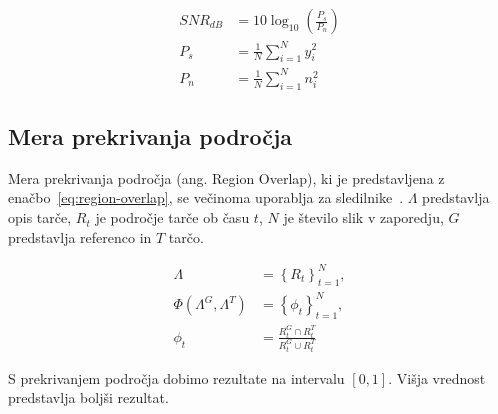 \begin{subequations}
\begin{align}
SNR_{dB} &= 10 \log_{10}\left(\frac{P_s}{P_n}\right) \\
P_s &= \frac{1}{N} \sum_{i=1}^{N} y_i^2 \\
P_n &= \frac{1}{N} \sum_{i=1}^{N} n_i^2
\end{align}
\label{eq:snr}
\end{subequations}



\subsection{Mera prekrivanja področja}
Mera prekrivanja področja (ang. Region Overlap), ki je predstavljena z enačbo~\ref{eq:region-overlap}, se večinoma uporablja za sledilnike~\cite{vcehovin2016visual}. $\Lambda$ predstavlja opis tarče, $R_t$ je področje tarče ob času $t$, $N$ je število slik v zaporedju, $G$ predstavlja referenco in $T$ tarčo.

\begin{subequations}
\begin{align}
	\Lambda &= \left\{R_t\right\}^N_{t=1}, \nonumber \\
	\Phi(\Lambda^G, \Lambda^T) &= \left\{\phi_t\right\}^N_{t=1}, \nonumber \\
    \phi_t &= \frac{R_t^G \cap R_t^T }{R_t^G \cup R_t^T} 
\end{align}
\label{eq:region-overlap}
\end{subequations}


S prekrivanjem področja dobimo rezultate na intervalu $\left[0,1\right]$. Višja vrednost predstavlja boljši rezultat.



